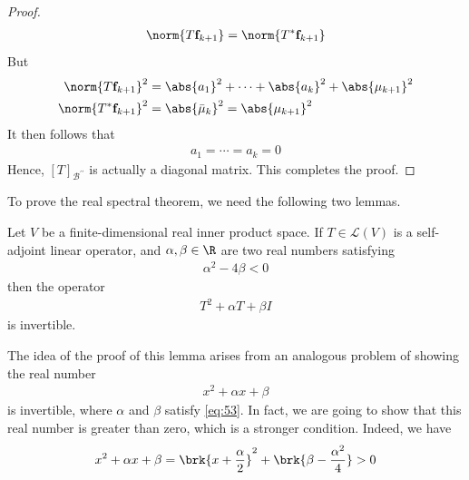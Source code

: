 \documentclass[thmcnt=section, color=blue, 12pt]{my-elegantbook}
\begin{document}
\begin{proof}
	\begin{align*}
		\norm{T \mathbf{f}_{k+1}} = \norm{T^\ast \mathbf{f}_{k+1}}
	\end{align*}
	But 
	\begin{align*}
		\norm{T \mathbf{f}_{k+1}}^2 &= \abs{a_1}^2 + \cdots + \abs{a_k}^2
		+ \abs{\mu_{k+1}}^2 \\
		\norm{T^\ast \mathbf{f}_{k+1}}^2 &= \abs{\bar{\mu}_k}^2 
		= \abs{\mu_{k+1}}^2
	\end{align*}
	It then follows that 
	\begin{align*}
		a_1 = \cdots = a_k = 0
	\end{align*}
	Hence, $[T]_{\mathcal{B}^{\prime\prime}}$ is actually a diagonal matrix.
	This completes the proof.
\end{proof}


To prove the real spectral theorem,
we need the following two lemmas.

\begin{lemma} \label{lem:2}
	Let $V$ be a finite-dimensional real inner product space.
	If $T \in \mathcal{L}(V)$ is a self-adjoint linear operator,
	and $\alpha, \beta \in \R$ are two real numbers satisfying 
	\begin{align}
		\alpha^2 - 4 \beta  < 0
		\label{eq:53}
	\end{align}
	then the operator
	\begin{align}
		T^2 + \alpha T + \beta I
		\label{eq:55}
	\end{align}
	is invertible.
\end{lemma}

The idea of the proof of this lemma 
arises from an analogous problem of showing the real number 
\begin{align*}
	x^2 + \alpha x + \beta
\end{align*}
is invertible, 
where $\alpha$ and $\beta$ satisfy \eqref{eq:53}.
In fact, we are going to show that this real number is greater than zero,
which is a stronger condition.
Indeed, we have 
\begin{align}
	x^2 + \alpha x + \beta 
	= \brk{x + \frac{\alpha}{2}}^2 + \brk{\beta - \frac{\alpha^2}{4}}
	 > 0
	 \label{eq:54}
\end{align}
\end{document}

